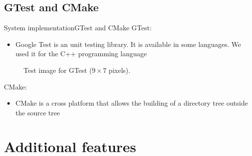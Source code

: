 \documentclass[10pt]{beamer}
\begin{document}
\subsection{GTest and CMake}
\begin{frame} {System implementation}{GTest and CMake}
GTest:
\begin{itemize}
\item Google Test is an unit testing library. It is available in some languages. We used it for the C++ programming language
\end{itemize}
\vspace{-0.25cm}
\begin{figure}
  \centering
  \caption{Test image for GTest ($9\times 7$ pixels).}
\end{figure}


CMake:
\begin{itemize}
\item CMake is a cross platform that allows the building of a directory tree outside the source tree
\end{itemize}

\end{frame}
\section{Additional features}
\end{document}
